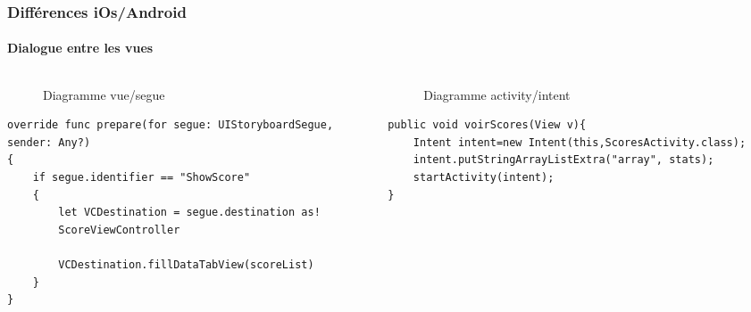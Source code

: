 \documentclass{beamer}
\begin{document}
\begin{frame}[fragile]
  \frametitle{Différences iOs/Android}
    \framesubtitle{Dialogue entre les vues}
    
    \begin{columns}
    
    \begin{column}{0.5\linewidth}
    \tiny
    \begin{figure}[H]
    
            \caption{Diagramme vue/segue}
    \end{figure}
    \begin{verbatim}
override func prepare(for segue: UIStoryboardSegue, 
sender: Any?) 
{
    if segue.identifier == "ShowScore"
    {
        let VCDestination = segue.destination as! 
        ScoreViewController

        VCDestination.fillDataTabView(scoreList)
    }
}
    \end{verbatim}
    
    \end{column}
    
    \begin{column}{0.5\linewidth}
    \tiny
    \begin{figure}[H]
            \caption{Diagramme activity/intent}
    \end{figure}
    \begin{verbatim}
public void voirScores(View v){
    Intent intent=new Intent(this,ScoresActivity.class);
    intent.putStringArrayListExtra("array", stats); 
    startActivity(intent);
}
    \end{verbatim}
    \end{column}
    \end{columns}
    
\end{frame}
\end{document}
